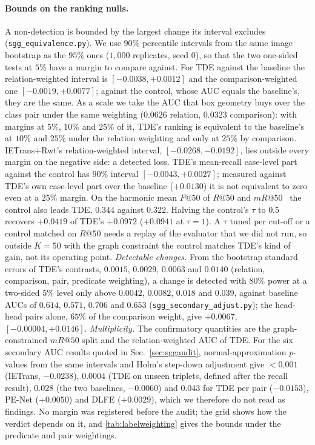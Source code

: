 \paragraph{Bounds on the ranking nulls.} A non-detection is bounded by the largest change its
interval excludes (\texttt{sgg\_equivalence.py}). We use $90\%$ percentile intervals from the
same image bootstrap as the $95\%$ ones ($1{,}000$ replicates, seed 0), so that the two
one-sided tests at $5\%$ have a margin to compare against. For TDE against the baseline the
relation-weighted interval is $[-0.0038,+0.0012]$ and the comparison-weighted one
$[-0.0019,+0.0077]$; against the control, whose AUC equals the baseline's, they are the same. As a scale we take the AUC that box geometry buys over the class pair
under the same weighting ($0.0626$ relation, $0.0323$ comparison): with margins at $5\%$, $10\%$
and $25\%$ of it, TDE's ranking is equivalent to the baseline's at $10\%$ and $25\%$ under the
relation weighting and only at $25\%$ by comparison. IETrans+Rwt's relation-weighted
interval, $[-0.0268,-0.0192]$, lies outside every margin on the negative side: a detected loss.
TDE's mean-recall case-level part against the control has $90\%$ interval $[-0.0043,+0.0027]$;
measured against TDE's own case-level part over the baseline ($+0.0130$) it is not equivalent
to zero even at a $25\%$ margin. On the harmonic mean $F@50$ of $R@50$ and $mR@50$~\cite{zhang2022finegrained} the control also
leads TDE, $0.344$ against $0.322$. Halving the control's $\tau$ to $0.5$ recovers $+0.0419$ of
TDE's $+0.0972$ ($+0.0941$ at $\tau=1$). A $\tau$ tuned per cut-off or a control matched on
$R@50$ needs a replay of the evaluator that we did not run, so outside $K=50$ with the graph
constraint the control matches TDE's kind of gain, not its operating point. \emph{Detectable changes.} From the bootstrap standard errors of TDE's contrasts, $0.0015$, $0.0029$,
$0.0063$ and $0.0140$ (relation, comparison, pair, predicate weighting), a change is detected with
$80\%$ power at a two-sided $5\%$ level only above $0.0042$, $0.0082$, $0.018$ and $0.039$, against
baseline AUCs of $0.614$, $0.571$, $0.706$ and $0.653$ (\texttt{sgg\_secondary\_adjust.py}); the
head-head pairs alone, $65\%$ of the comparison weight, give $+0.0067$, $[-0.00004,+0.0146]$.
\emph{Multiplicity.} The confirmatory quantities are the graph-constrained $mR@50$ split and the
relation-weighted AUC of TDE. For the six secondary AUC results quoted in Sec.~\ref{sec:sggaudit},
normal-approximation $p$-values from the same intervals and Holm's step-down adjustment give
$<0.001$ (IETrans, $-0.0238$), $0.0004$ (TDE on unseen triplets, defined after the recall
result), $0.028$ (the two baselines, $-0.0060$) and $0.043$ for TDE per pair ($-0.0153$), PE-Net
($+0.0050$) and DLFE ($+0.0029$), which we therefore do not read as findings.
No margin was registered before the audit; the grid shows
how the verdict depends on it, and \cref{tab:labelweighting} gives the bounds under the
predicate and pair weightings.

